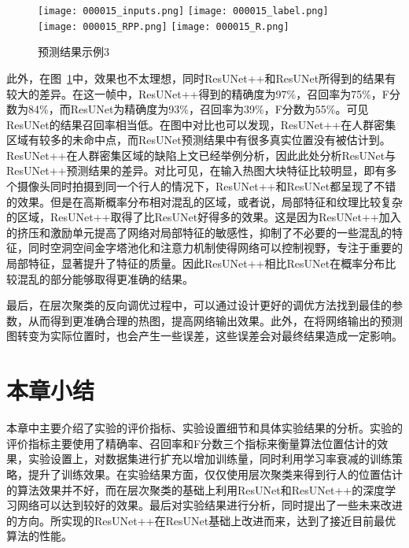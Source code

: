 \begin{figure}[H]
    \centering
      {\texttt{[image: 000015\_inputs.png]}}
      {\texttt{[image: 000015\_label.png]}}
      {\texttt{[image: 000015\_RPP.png]}}
      {\texttt{[image: 000015\_R.png]}}
    \caption{预测结果示例3}
    \label{failure2}
\end{figure}
此外，在图~\ref{failure2}中，效果也不太理想，同时ResUNet++和ResUNet所得到的结果有较大的差异。在这一帧中，ResUNet++得到的精确度为97\%，召回率为75\%，F分数为84\%，而ResUNet为精确度为93\%，召回率为39\%，F分数为55\%。可见ResUNet的结果召回率相当低。在图中对比也可以发现，ResUNet++在人群密集区域有较多的未命中点，而ResUNet预测结果中有很多真实位置没有被估计到。ResUNet++在人群密集区域的缺陷上文已经举例分析，因此此处分析ResUNet与ResUNet++预测结果的差异。对比可见，在输入热图大块特征比较明显，即有多个摄像头同时拍摄到同一个行人的情况下，ResUNet++和ResUNet都呈现了不错的效果。但是在高斯概率分布相对混乱的区域，或者说，局部特征和纹理比较复杂的区域，ResUNet++取得了比ResUNet好得多的效果。这是因为ResUNet++加入的挤压和激励单元提高了网络对局部特征的敏感性，抑制了不必要的一些混乱的特征，同时空洞空间金字塔池化和注意力机制使得网络可以控制视野，专注于重要的局部特征，显著提升了特征的质量。因此ResUNet++相比ResUNet在概率分布比较混乱的部分能够取得更准确的结果。

最后，在层次聚类的反向调优过程中，可以通过设计更好的调优方法找到最佳的参数，从而得到更准确合理的热图，提高网络输出效果。此外，在将网络输出的预测图转变为实际位置时，也会产生一些误差，这些误差会对最终结果造成一定影响。

\section{本章小结}

本章中主要介绍了实验的评价指标、实验设置细节和具体实验结果的分析。实验的评价指标主要使用了精确率、召回率和F分数三个指标来衡量算法位置估计的效果，实验设置上，对数据集进行扩充以增加训练量，同时利用学习率衰减的训练策略，提升了训练效果。在实验结果方面，仅仅使用层次聚类来得到行人的位置估计的算法效果并不好，而在层次聚类的基础上利用ResUNet和ResUNet++的深度学习网络可以达到较好的效果。最后对实验结果进行分析，同时提出了一些未来改进的方向。所实现的ResUNet++在ResUNet基础上改进而来，达到了接近目前最优算法的性能。